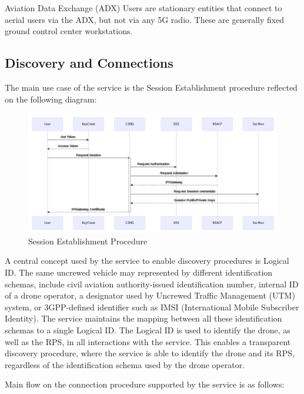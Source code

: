 \documentclass[a4paper,conference]{IEEEtran}
\begin{document}
Aviation Data Exchange (ADX) Users are stationary entities that connect to aerial users via the ADX, but not via any 5G radio. These are generally fixed ground control center workstations.

\subsection{Discovery and Connections}

The main use case of the service is the Session Establishment procedure reflected on the following diagram:

\begin{figure}[!ht]
\centering
\includegraphics[width=0.9\linewidth]{images/session.png}
\caption{Session Establishment Procedure}\label{fig:session}
\end{figure}

A central concept used by the service to enable discovery procedures is Logical ID. The same uncrewed vehicle may represented by different identification schemas, include civil aviation authority-issued identification number, internal ID of a drone operator, a designator used by Uncrewed Traffic Management (UTM) system, or 3GPP-defined identifier such as IMSI (International Mobile Subscriber Identity). The service maintains the mapping between all these identification schemas to a single Logical ID. The Logical ID is used to identify the drone, as well as the RPS, in all interactions with the service. This enables a transparent discovery procedure, where the service is able to identify the drone and its RPS, regardless of the identification schema used by the drone operator.

Main flow on the connection procedure supported by the service is as follows:
\end{document}

